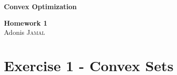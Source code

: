 \documentclass[11pt,a4paper]{article}
\begin{document}
\begin{titlepage}
\begin{center}

{\huge \bfseries Convex Optimization\\[0.4cm]}

{\large \bfseries Homework 1\\[0.4cm] }
{\Large Adonis \textsc{Jamal}}

\vspace{3cm}

\tableofcontents

\end{center}
\end{titlepage}

\renewcommand{\arraystretch}{1.5}
\newpage


\section{Exercise 1 - Convex Sets}
\end{document}
